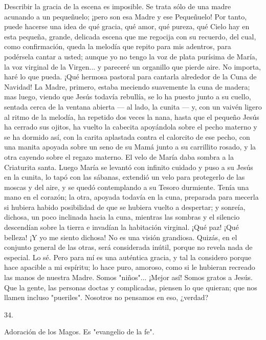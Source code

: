 \documentclass[12pt]{book} %
\begin{document}
Describir la gracia de la escena es imposible. Se trata sólo de una madre acunando a un pequeñuelo; ¡pero son esa Madre y ese Pequeñuelo! Por tanto, puede hacerse una idea de qué gracia, qué amor, qué pureza, qué Cielo hay en esta pequeña, grande, delicada escena que me regocija con su recuerdo, del cual, como confirmación, queda la melodía que repito para mis adentros, para podérsela cantar a usted; aunque yo no tengo la voz de plata purísima de María, la voz virginal de la Virgen... y pareceré un organillo que pierde aire. No importa, haré lo que pueda. ¡Qué hermosa pastoral para cantarla alrededor de la Cuna de Navidad! 
La Madre, primero, estaba meciendo suavemente la cuna de madera; mas luego, viendo que Jesús todavía rebullía, se 
lo ha puesto junto a su cuello, sentada cerca de la ventana abierta — al lado, la cunita — y, con un vaivén ligero al ritmo de la melodía, ha repetido dos veces la nana, hasta que el pequeño Jesús ha cerrado sus ojitos, ha vuelto la cabecita apoyándola sobre el pecho materno y se ha dormido así, con la carita aplastada contra el calorcito de ese pecho, con una manita apoyada sobre un seno de su Mamá junto a su carrillito rosado, y la otra cayendo sobre el regazo materno. El velo de María daba sombra a la Criaturita santa. 
Luego María se levantó con infinito cuidado y puso a su Jesús en la cunita, lo tapó con las sábanas, extendió un velo para protegerlo de las moscas y del aire, y se quedó contemplando a su Tesoro durmiente. Tenía una mano en el corazón; la otra, apoyada todavía en la cuna, preparada para mecerla si hubiera habido posibilidad de que se hubiera vuelto a despertar; y sonreía, dichosa, un poco inclinada hacia la cuna, mientras las sombras y el silencio descendían sobre la tierra e invadían la habitación virginal. 
¡Qué paz! ¡Qué belleza! ¡Y yo me siento dichosa! 
No es una visión grandiosa. Quizás, en el conjunto general de las otras, será considerada inútil, porque no revela nada 
de especial. Lo sé. Pero para mí es una auténtica gracia, y tal la considero porque hace apacible a mi espíritu; lo hace puro, amoroso, como si le hubieran recreado las manos de nuestra Madre. Somos "niños"... ¡Mejor así! Somos gratos a Jesús. Que la gente, las personas doctas y complicadas, piensen lo que quieran; que nos llamen incluso "pueriles". Nosotros no pensamos en eso, ¿verdad? 
 
34. 
 
Adoración de los Magos. Es "evangelio de la fe". 
 
\end{document}
